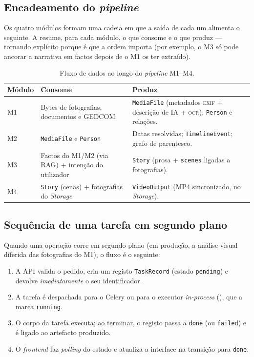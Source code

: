 \subsection{Encadeamento do \emph{pipeline}}

Os quatro módulos formam uma cadeia em que a saída de cada um alimenta o
seguinte. A  resume, para cada módulo, o que consome e o
que produz — tornando explícito porque é que a ordem importa (por exemplo,
o M3 só pode ancorar a narrativa em factos depois de o M1 os ter
extraído).

\begin{table}[H]
\centering
\caption{Fluxo de dados ao longo do \emph{pipeline} M1--M4.}
\label{tab:fluxo}
\small
\begin{tabularx}{\linewidth}{@{}p{1.5cm}YY@{}}
\toprule
\textbf{Módulo} & \textbf{Consome} & \textbf{Produz} \\
\midrule
M1 & Bytes de fotografias, documentos e GEDCOM & \texttt{MediaFile} (metadados
\textsc{exif} + descrição de IA + \textsc{ocr}); \texttt{Person} e relações. \\
M2 & \texttt{MediaFile} e \texttt{Person} & Datas resolvidas;
\texttt{TimelineEvent}; grafo de parentesco. \\
M3 & Factos do M1/M2 (via RAG) + intenção do utilizador & \texttt{Story}
(prosa + \texttt{scenes} ligadas a fotografias). \\
M4 & \texttt{Story} (cenas) + fotografias do \emph{Storage} &
\texttt{VideoOutput} (MP4 sincronizado, no \emph{Storage}). \\
\bottomrule
\end{tabularx}
\end{table}

\subsection{Sequência de uma tarefa em segundo plano}

Quando uma operação corre em segundo plano (em produção, a análise visual
diferida das fotografias do M1), o fluxo é o seguinte:

\begin{enumerate}[leftmargin=*]
  \item A API valida o pedido, cria um registo \texttt{TaskRecord} (estado
  \texttt{pending}) e devolve \emph{imediatamente} o seu identificador.
  \item A tarefa é despachada para o Celery ou para o executor
  \emph{in-process} (), que a marca \texttt{running}.
  \item O corpo da tarefa executa; ao terminar, o registo passa a
  \texttt{done} (ou \texttt{failed}) e é ligado ao artefacto produzido.
  \item O \emph{frontend} faz \emph{polling} do estado e atualiza a
  interface na transição para \texttt{done}.
\end{enumerate}

